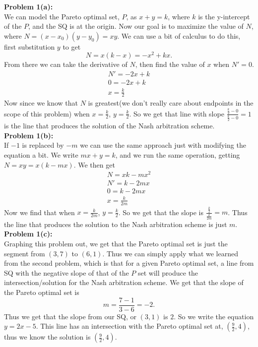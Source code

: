 \documentclass[12pt]{article}
\begin{document}
\noindent
\textbf{Problem 1(a): }\\
We can model the Pareto optimal set, $P$, as $x+y=k$, where $k$ is the y-intercept of the $P$, and 
the SQ is at the origin. Now our goal is to maximize the value of $N$, where  $N = (x-x_0)(y-y_0) = xy$. 
We can use a bit of calculus to do this, first substitution $y$ to get
\[
N = x(k-x) = -x^2+kx
.\] 
From there we can take the derivative of $N$, then find the value of $x$ when $N' = 0$.
\begin{align*}
	N' = -2x+k \\
	0 = -2x+k \\
	x = \frac{k}{2}		
\end{align*}
Now since we know that $N$ is greatest(we don't really care about endpoints in the scope of this problem)
when $x = \frac{k}{2}$, $y = \frac{k}{2}$. So we get that line with slope 
$\frac{\frac{k}{2}-0}{\frac{k}{2}-0} = 1$ is the line that produces the solution of the Nash arbitration scheme. \\

\noindent
\textbf{Problem 1(b): }\\
If $-1$ is replaced by $-m$ we can use the same approach just with modifying the equation a bit. We write
$mx+y=k$, and we run the same operation, getting $N = xy = x(k-mx)$. We then get
\begin{align*}
	N = xk-mx^2 \\
	N' = k-2mx \\
	0 = k-2mx \\
	x = \frac{k}{2m}
\end{align*}
Now we find that when $x = \frac{k}{2m}$, $y = \frac{k}{2}$. So we get that the slope is 
$\frac{\frac{k}{2}}{\frac{k}{2m}} = m$. Thus the line that produces the solution to the Nash arbitration scheme 
is just $m$. \\

\noindent
\textbf{Problem 1(c): } \\
Graphing this problem out, we get that the Pareto optimal set is just the segment from $(3,7)$ to $(6,1)$.
Thus we can simply apply what we learned from the second problem, which is that for a given Pareto optimal set,
a line from SQ with the negative slope of that of the $P$ set will produce the intersection/solution for the 
Nash arbitration scheme. We get that the slope of the Pareto optimal set is
\[
m = \frac{7-1}{3-6} = -2
.\] 
Thus we get that the slope from our SQ, or $(3, 1)$ is $2$. So we write the equation $y = 2x-5$. This line
has an intersection with the Pareto optimal set at, $(\frac{9}{2}, 4)$, thus we know the solution is 
$(\frac{9}{2}, 4)$. \\
\end{document}
